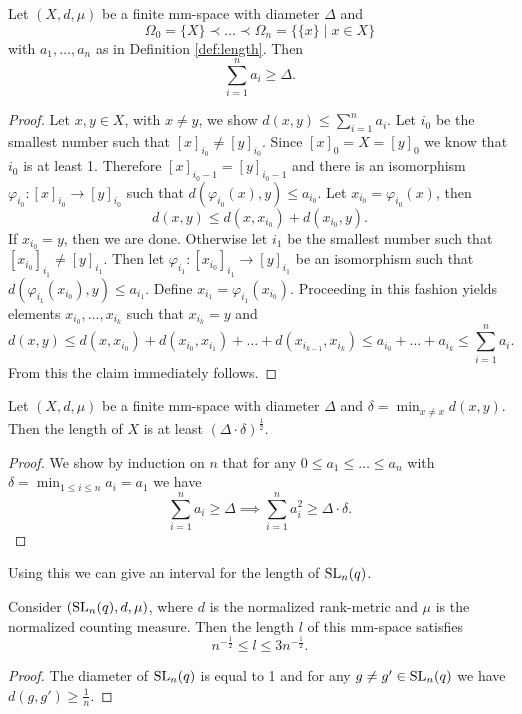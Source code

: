 \begin{lemma}
Let $(X,d,\mu)$ be a finite mm-space with diameter $\Delta$ and %
\[\Omega_0=\{X\}\prec\dots\prec\Omega_n=\{\{x\}\mid x\in X\}\]
with $a_1,\dots,a_n$ as in Definition \ref{def:length}. Then 
\[\sum_{i=1}^{n}a_i\geq \Delta.\]
\end{lemma}
\begin{proof}
Let $x,y\in X$, with $x\neq y$, we show $d(x,y)\leq\sum_{i=1}^{n}a_i$. Let $i_0$ be the smallest number such that $[x]_{i_0}\neq [y]_{i_0}$. Since $[x]_0=X=[y]_0$ we know that $i_0$ is at least 1. Therefore $[x]_{i_0-1}=[y]_{i_0-1}$ and there is an isomorphism $\varphi_{i_0}\colon[x]_{i_0}\to[y]_{i_0}$ such that $d(\varphi_{i_0}(x),y)\leq a_{i_0}$. %
Let $x_{i_0}=\varphi_{i_0}(x)$, then 
\[d(x,y)\leq d(x,x_{i_0})+d(x_{i_0},y).\]
If $x_{i_0}=y$, then we are done. Otherwise let $i_1$ be the smallest number such that $[x_{i_0}]_{i_1}\neq [y]_{i_1}$. Then let $\varphi_{i_1}\colon[x_{i_0}]_{i_1}\to[y]_{i_1}$ be an isomorphism such that $d(\varphi_{i_1}(x_{i_0}),y)\leq a_{i_1}$. Define $x_{i_1}=\varphi_{i_1}(x_{i_0})$. Proceeding in this fashion yields elements $x_{i_0},\dots,x_{i_k}$ such that $x_{i_k}=y$ and
\[d(x,y)\leq d(x,x_{i_0})+d(x_{i_0},x_{i_1})+\dots+d(x_{i_{k-1}},x_{i_k})\leq a_{i_0}+\dots +a_{i_k}\leq\sum_{i=1}^{n}a_i.\]
From this the claim immediately follows.
\end{proof}


\begin{lemma}
Let $(X,d,\mu)$ be a finite mm-space with diameter $\Delta$ and $\delta=\min_{x\not=x} d(x,y)$. Then the length of $X$ is at least $(\Delta\cdot\delta)^{\frac{1}{2}}$.
\end{lemma}
\begin{proof}
We show by induction on $n$ that for any $0\leq a_1\leq\dots\leq a_n$ with $\delta=\min_{1\leq i\leq n} a_i=a_1$ we have
\[\sum_{i=1}^{n}a_i\geq \Delta\implies \sum_{i=1}^{n}a_i^2\geq \Delta\cdot\delta.\]

\end{proof}

Using this we can give an interval for the length of $\operatorname{SL}_n(q)$.

\begin{corollary}
Consider $(\operatorname{SL}_{n}(q),d,\mu)$, where $d$ is the normalized rank-metric and $\mu$ is the normalized counting measure. Then the length $l$ of this mm-space satisfies
\[n^{-\frac{1}{2}}\leq l\leq 3n^{-\frac{1}{2}}.\]
\end{corollary}
\begin{proof}
The diameter of $\operatorname{SL}_n(q)$ is equal to 1 and for any $g\not=g'\in\operatorname{SL}_n(q)$ we have $d(g,g')\geq \frac1n$.
\end{proof}

